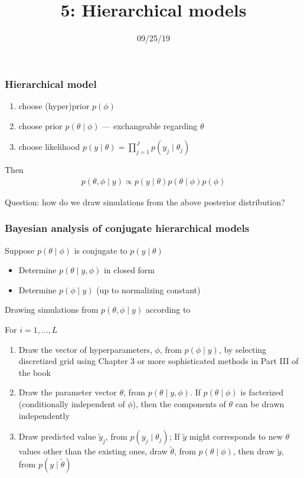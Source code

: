 \documentclass{beamer}
\title["5"]{5: Hierarchical models}
\date{09/25/19}
\begin{document}

\begin{frame}
\titlepage 
\end{frame}



\begin{frame}
  \frametitle{Hierarchical model}
  \begin{enumerate}
\item choose (hyper)prior $p(\phi)$ 
\item choose prior $p(\theta \mid \phi)$ --- exchangeable regarding $\theta$
\item choose likelihood $p(y \mid \theta) = \prod_{j=1}^{J}p(y_j \mid \theta_{j})$
\end{enumerate}

Then 
\begin{align*}
p(\theta, \phi \mid y) \propto p(y \mid \theta)p(\theta \mid \phi)p(\phi) 
\end{align*}

Question: how do we draw simulations from the above posterior distribution?

\end{frame}
\begin{frame}
  \frametitle{Bayesian analysis of conjugate hierarchical models}
  Suppose $p(\theta \mid \phi)$ is conjugate to $p(y \mid \theta)$ 
  \begin{itemize}
  \item Determine $p(\theta \mid y, \phi)$ in closed form
  \item Determine $p(\phi \mid y)$ (up to normalizing constant) 
  \end{itemize}

  Drawing simulations from $p(\theta, \phi \mid y)$ according to

  \pause
  For $i = 1, \ldots, L$
  \begin{enumerate}
  \item Draw the vector of hyperparameters, $\phi$, from $p(\phi \mid y)$, by selecting discretized grid using Chapter 3 or more sophisticated methods in Part III of the book
  \pause
\item Draw the parameter vector $\theta$, from $p(\theta \mid y, \phi)$. If $p(\theta \mid \phi)$ is facterized (conditionally independent of $\phi$), then the components of $\theta$ can be drawn independently 
  \pause
\item Draw predicted value $\tilde{y}_j$, from $p(y_j \mid \theta_j)$; If $\tilde{y}$ might corresponds to new $\theta$ values other than the existing ones, draw $\tilde{\theta}$, from $p(\theta \mid \phi)$, then draw $\tilde{y}$, from $p(y \mid \tilde{\theta})$ 
\end{enumerate}  
\end{frame}
\end{document}
